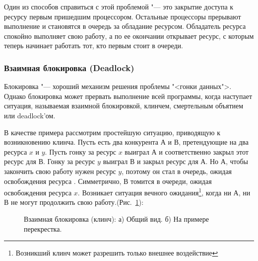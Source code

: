\documentclass{article}
\begin{document}
				Один из способов справиться с этой проблемой "--- это закрытие доступа к ресурсу первым пришедшим процессором. 					Остальные процессоры прерывают выполнение и становятся в очередь за обладание ресурсом. Обладатель ресурса спокойно 				выполняет свою работу, а по ее окончании открывает ресурс, с которым теперь начинает работать тот, кто первым стоит в 			очереди.

				
			\subsubsection{Взаимная блокировка (Deadlock)}
				Блокировка "--- хороший механизм решения проблемы "<гонки данных">. Однако блокировка может прервать выполнение 				всей программы, когда наступает ситуация, называемая взаимной блокировкой, клинчем, смертельным объятием или 						deadlock'ом.
				
				В качестве примера рассмотрим простейшую ситуацию, приводящую к возникновению клинча. Пусть есть два конкурента 				$А$ и $В$, претендующие на два ресурса $x$ и $y$. Пусть гонку за ресурс $x$ выиграл $А$ и соответственно закрыл этот 				ресурс для $В$. Гонку за ресурс $y$ выиграл $В$ и закрыл ресурс для $А$. Но $А$, чтобы закончить свою работу нужен 					ресурс $y$, поэтому он стал в очередь, ожидая 	освобождения ресурса . Симметрично, $В$ томится в очереди, ожидая 					освобождения ресурса $x$. Возникает 	ситуация вечного ожидания\footnote{Возникший клинч может разрешить только 					внешнее воздействие}, когда ни $А$, ни $В$ не могут продолжить свою работу.(Рис.~\ref{ris:deadlock}):
			
			\begin{figure}[h!]
				\caption{Взаимная блокировка (клинч): а) Общий вид. б) На примере перекрестка.}
				\label{ris:deadlock}
			\end{figure}
			
\end{document}
